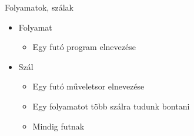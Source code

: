 \begin{frame}
 {
\begin{alertblock}{Folyamatok, szálak}
	\begin{itemize}
		\item Folyamat
		\begin{itemize}
			\item Egy futó program elnevezése
		\end{itemize}
		\item Szál
		\begin{itemize}
			\item Egy futó műveletsor elnevezése
			\item Egy folyamatot több szálra tudunk bontani
			\item Mindig  futnak
		\end{itemize}
	\end{itemize}
\end{alertblock}
}

\end{frame}